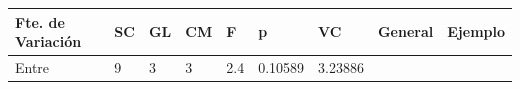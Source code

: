 \documentclass[]{book}
\theoremstyle{definition}
\theoremstyle{definition}
\theoremstyle{definition}
\theoremstyle{remark}
\begin{document}
\begin{longtable}[]{@{}lllllllll@{}}
\toprule
\begin{minipage}[b]{0.13\columnwidth}\raggedright
Fte. de Variación\strut
\end{minipage} & \begin{minipage}[b]{0.03\columnwidth}\raggedright
SC\strut
\end{minipage} & \begin{minipage}[b]{0.03\columnwidth}\raggedright
GL\strut
\end{minipage} & \begin{minipage}[b]{0.04\columnwidth}\raggedright
CM\strut
\end{minipage} & \begin{minipage}[b]{0.03\columnwidth}\raggedright
F\strut
\end{minipage} & \begin{minipage}[b]{0.06\columnwidth}\raggedright
p\strut
\end{minipage} & \begin{minipage}[b]{0.06\columnwidth}\raggedright
VC\strut
\end{minipage} & \begin{minipage}[b]{0.20\columnwidth}\raggedright
General\strut
\end{minipage} & \begin{minipage}[b]{0.19\columnwidth}\raggedright
Ejemplo\strut
\end{minipage}\tabularnewline
\midrule
\endhead
\begin{minipage}[t]{0.13\columnwidth}\raggedright
Entre\strut
\end{minipage} & \begin{minipage}[t]{0.03\columnwidth}\raggedright
9\strut
\end{minipage} & \begin{minipage}[t]{0.03\columnwidth}\raggedright
3\strut
\end{minipage} & \begin{minipage}[t]{0.04\columnwidth}\raggedright
3\strut
\end{minipage} & \begin{minipage}[t]{0.03\columnwidth}\raggedright
2.4\strut
\end{minipage} & \begin{minipage}[t]{0.06\columnwidth}\raggedright
0.10589\strut
\end{minipage} & \begin{minipage}[t]{0.06\columnwidth}\raggedright
3.23886\strut
\end{minipage} & \begin{minipage}[t]{0.20\columnwidth}\raggedright

\end{minipage}
\end{longtable}
\end{document}
